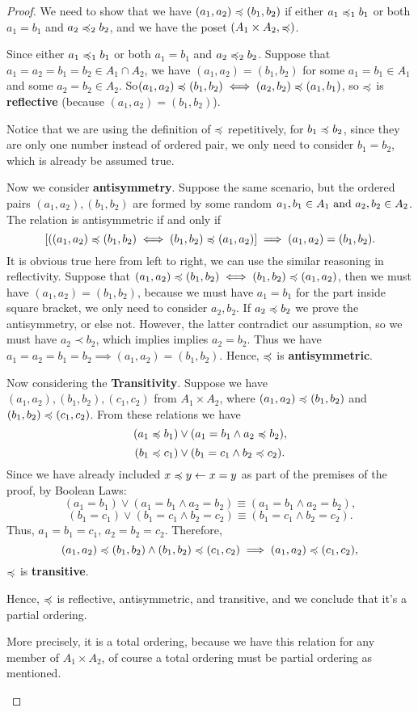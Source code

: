 \begin{proof}
	We need to show that we have $(a_1, a_2) \preccurlyeq (b_1, b_2)$ if either \( a_1 \preccurlyeq_1 b_1 \) or both \( a_1 = b_1 \) and \( a_2 \preccurlyeq_2 b_2 \), and we have the poset $(A_1\times A_2, \preccurlyeq)$.
	
	Since  either \( a_1 \preccurlyeq_1 b_1 \) or both \( a_1 = b_1 \) and \( a_2 \preccurlyeq_2 b_2 \). Suppose that \(a_1=a_2=b_1=b_2 \in A_1\cap A_2\), we have \( (a_1,a_2) = (b_1,b_2)\) for some $a_1=b_1 \in A_1 $ and some $a_2=b_2\in A_2$. So\((a_1,a_2) \preccurlyeq (b_1,b_2) \iff (a_2,b_2) \preccurlyeq (a_1,b_1)\), so \(\preccurlyeq\) is \textbf{reflective} (because \((a_1,a_2) = (b_1,b_2)\)). 
	\begin{remark}
		Notice that we are using the definition of $\preccurlyeq$ repetitively, for $b_1 \preccurlyeq b_2$, since they are only one number instead of ordered pair, we only need to consider $b_1 = b_2$, which is already be assumed true.
	\end{remark}
	Now we consider \textbf{antisymmetry}. Suppose the same scenario, but the ordered pairs $(a_1,a_2), (b_1,b_2)$ are formed by some random $a_1, b_1 \in A_1 \text{ and } a_2, b_2 \in A_2$. The relation is antisymmetric if and only if 
	\[[((a_1,a_2) \preccurlyeq (b_1, b_2) \iff (b_1, b_2) \preccurlyeq (a_1,a_2)] \implies (a_1,a_2) = (b_1,b_2).\]
	It is obvious true here from left to right, we can use the similar reasoning in reflectivity.  Suppose that $(a_1,a_2) \preccurlyeq (b_1, b_2) \iff (b_1, b_2) \preccurlyeq (a_1,a_2)$, then we must have $(a_1,a_2) = (b_1, b_2)$, because we must have $a_1 = b_1$ for the part inside square bracket, we only need to consider $a_2, b_2$. If $a_2 \preccurlyeq b_2$ we prove the antisymmetry, or else not. However, the latter contradict our assumption, so we must have $a_2 \prec b_2$, which implies implies $a_2 = b_2$. Thus we have $a_1 = a_2 = b_1 = b_2 \implies (a_1,a_2) = (b_1, b_2)$. Hence, $\preccurlyeq$ is \textbf{antisymmetric}.
	
	Now considering the \textbf{Transitivity}. Suppose we have \((a_1,a_2), (b_1,b_2), (c_1,c_2)\) from $A_1\times A_2$, where \((a_1,a_2) \preccurlyeq (b_1,b_2) \) and $(b_1,b_2)\preccurlyeq (c_1,c_2)$. From these relations we have 
	\[(a_1 \preccurlyeq b_1) \lor (a_1 = b_1 \land a_2 \preccurlyeq b_2),\]
	\[(b_1 \preccurlyeq c_1) \lor (b_1 = c_1 \land b_2 \preccurlyeq c_2).\]
	Since we have already included $x\preccurlyeq y\gets x = y$ as part of the premises of the proof, by Boolean Laws:
	\[(a_1=b_1) \lor (a_1=b_1 \land a_2 = b_2) \equiv (a_1=b_1 \land a_2 = b_2),\]
	\[(b_1=c_1) \lor (b_1=c_1 \land b_2 = c_2) \equiv (b_1=c_1 \land b_2 = c_2).\]
	Thus, $a_1 = b_1 = c_1$, $a_2 = b_2 = c_2$. Therefore,
	\[(a_1,a_2) \preccurlyeq (b_1,b_2) \land (b_1,b_2)\preccurlyeq (c_1,c_2) \implies (a_1,a_2) \preccurlyeq (c_1,c_2),\]
	$\preccurlyeq$ is \textbf{transitive}.
	
	Hence, $\preccurlyeq$ is reflective, antisymmetric, and transitive, and we conclude that it's a partial ordering.
	\begin{remark}
		More precisely, it is a total ordering, because we have this relation for any member of $A_1\times A_2$, of course a total ordering must be partial ordering as mentioned.
	\end{remark}
\end{proof}

